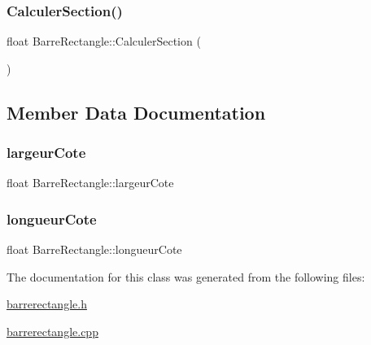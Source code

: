 \mbox{\label{class_barre_rectangle_aca359a79b9e74a94867ccaa4341f51ae}} 
\subsubsection{\texorpdfstring{Calculer\+Section()}{CalculerSection()}}
{\footnotesize\ttfamily float Barre\+Rectangle\+::\+Calculer\+Section (\begin{DoxyParamCaption}{ }\end{DoxyParamCaption})}



\subsection{Member Data Documentation}
\mbox{\label{class_barre_rectangle_acbf8366a8851f9534f998324365874c1}} 
\subsubsection{\texorpdfstring{largeur\+Cote}{largeurCote}}
{\footnotesize\ttfamily float Barre\+Rectangle\+::largeur\+Cote\hspace{0.3cm}{\ttfamily [private]}}

\mbox{\label{class_barre_rectangle_a8b499c3a9e28d479072f39232cfceef6}} 
\subsubsection{\texorpdfstring{longueur\+Cote}{longueurCote}}
{\footnotesize\ttfamily float Barre\+Rectangle\+::longueur\+Cote\hspace{0.3cm}{\ttfamily [private]}}



The documentation for this class was generated from the following files\+:\begin{DoxyCompactItemize}
\item 
\hyperlink{barrerectangle_8h}{barrerectangle.\+h}\item 
\hyperlink{barrerectangle_8cpp}{barrerectangle.\+cpp}\end{DoxyCompactItemize}
